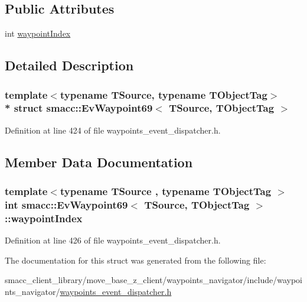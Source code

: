 \subsection*{Public Attributes}
\begin{DoxyCompactItemize}
\item 
int \hyperlink{structsmacc_1_1EvWaypoint69_ae5567b474a7dbbbd224515812f3a8e8a}{waypoint\+Index}
\end{DoxyCompactItemize}


\subsection{Detailed Description}
\subsubsection*{template$<$typename T\+Source, typename T\+Object\+Tag$>$\\*
struct smacc\+::\+Ev\+Waypoint69$<$ T\+Source, T\+Object\+Tag $>$}



Definition at line 424 of file waypoints\+\_\+event\+\_\+dispatcher.\+h.



\subsection{Member Data Documentation}
\subsubsection[{\texorpdfstring{waypoint\+Index}{waypointIndex}}]{\setlength{\rightskip}{0pt plus 5cm}template$<$typename T\+Source , typename T\+Object\+Tag $>$ int {\bf smacc\+::\+Ev\+Waypoint69}$<$ T\+Source, T\+Object\+Tag $>$\+::waypoint\+Index}\hypertarget{structsmacc_1_1EvWaypoint69_ae5567b474a7dbbbd224515812f3a8e8a}{}\label{structsmacc_1_1EvWaypoint69_ae5567b474a7dbbbd224515812f3a8e8a}


Definition at line 426 of file waypoints\+\_\+event\+\_\+dispatcher.\+h.



The documentation for this struct was generated from the following file\+:\begin{DoxyCompactItemize}
\item 
smacc\+\_\+client\+\_\+library/move\+\_\+base\+\_\+z\+\_\+client/waypoints\+\_\+navigator/include/waypoints\+\_\+navigator/\hyperlink{waypoints__event__dispatcher_8h}{waypoints\+\_\+event\+\_\+dispatcher.\+h}\end{DoxyCompactItemize}
